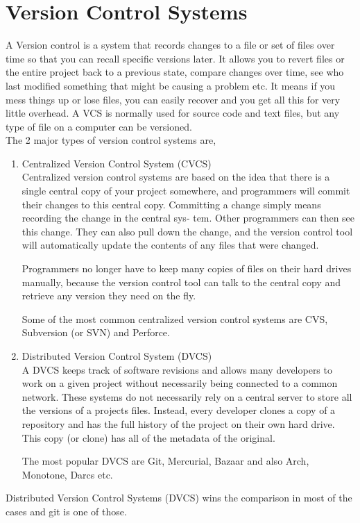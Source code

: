 \section{Version Control Systems}

A Version control is a system that records changes to a file or set of
files over time so that you can recall specific versions later. It
allows you to revert files or the entire project back to a previous
state, compare changes over time, see who last modified something that
might be causing a problem etc. It means if you mess things up or lose
files, you can easily recover and you get all this for very little
overhead. A VCS is normally used for source code and
text files, but any type of file on a computer can be versioned. \\


The 2 major types of version control systems are,

\begin{enumerate}

\item{Centralized Version Control System (CVCS)}  \hfill \\

  Centralized version control systems are based on the idea that there
  is a single central copy of your project somewhere, and programmers
  will commit their changes to this central copy. Committing a change
  simply means recording the change in the central sys- tem. Other
  programmers can then see this change. They can also pull down the
  change, and the version control tool will automatically update the
  contents of any files that were changed.

  Programmers no longer have to keep many copies of files on their
  hard drives manually, because the version control tool can talk to
  the central copy and retrieve any version they need on the fly.

  Some of the most common centralized version control systems are CVS,
  Subversion (or SVN) and Perforce.

\item{Distributed Version Control System (DVCS)}  \hfill \\
  A DVCS keeps track of software revisions and allows many developers
  to work on a given project without necessarily being connected to a
  common network. These systems do not necessarily rely on a central
  server to store all the versions of a projects files. Instead, every
  developer clones a copy of a repository and has the full history of
  the project on their own hard drive. This copy (or clone) has all of
  the metadata of the original.

  The most popular DVCS are Git, Mercurial, Bazaar and also Arch,
  Monotone, Darcs etc.
\end{enumerate}

Distributed Version Control Systems (DVCS) wins the comparison in most
of the cases and git is one of those.
